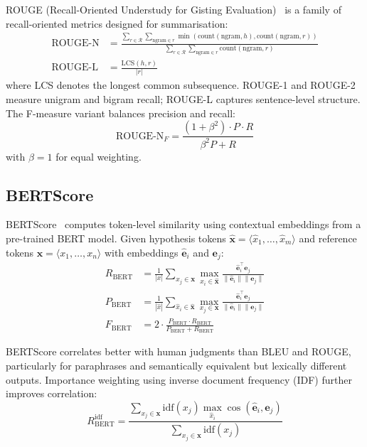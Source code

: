 ROUGE (Recall-Oriented Understudy for Gisting Evaluation)~\cite{lin2004rouge} is a family of recall-oriented metrics designed for summarisation: 
\begin{align}
    \text{ROUGE-N} &= \frac{\sum_{r \in \mathcal{R}} \sum_{\text{ngram} \in r} \min(\text{count}(\text{ngram}, h), \text{count}(\text{ngram}, r))}{\sum_{r \in \mathcal{R}} \sum_{\text{ngram} \in r} \text{count}(\text{ngram}, r)} \\[6pt]
    \text{ROUGE-L} &= \frac{\text{LCS}(h, r)}{|r|}
\end{align}
 where LCS denotes the longest common subsequence. ROUGE-1 and ROUGE-2 measure unigram and bigram recall; ROUGE-L captures sentence-level structure. The F-measure variant balances precision and recall: 
\begin{equation}
    \text{ROUGE-N}_F = \frac{(1+\beta^2) \cdot P \cdot R}{\beta^2 P + R}
\end{equation}
 with $\beta = 1$ for equal weighting.

\subsection{BERTScore}
\label{bertscore}

BERTScore~\cite{zhang2020bertscore} computes token-level similarity using contextual embeddings from a pre-trained BERT model. Given hypothesis tokens $\hat{\mathbf{x}} = \langle \hat{x}_1, \ldots, \hat{x}_m \rangle$ and reference tokens $\mathbf{x} = \langle x_1, \ldots, x_n \rangle$ with embeddings $\hat{\mathbf{e}}_i$ and $\mathbf{e}_j$: 
\begin{align}
    R_{\text{BERT}} &= \frac{1}{|x|} \sum_{x_j \in \mathbf{x}} \max_{\hat{x}_i \in \hat{\mathbf{x}}} \frac{\hat{\mathbf{e}}_i^\top \mathbf{e}_j}{\|\hat{\mathbf{e}}_i\| \|\mathbf{e}_j\|} \\[4pt]
    P_{\text{BERT}} &= \frac{1}{|\hat{x}|} \sum_{\hat{x}_i \in \hat{\mathbf{x}}} \max_{x_j \in \mathbf{x}} \frac{\hat{\mathbf{e}}_i^\top \mathbf{e}_j}{\|\hat{\mathbf{e}}_i\| \|\mathbf{e}_j\|} \\[4pt]
    F_{\text{BERT}} &= 2 \cdot \frac{P_{\text{BERT}} \cdot R_{\text{BERT}}}{P_{\text{BERT}} + R_{\text{BERT}}}
\end{align}

BERTScore correlates better with human judgments than BLEU and ROUGE, particularly for paraphrases and semantically equivalent but lexically different outputs. Importance weighting using inverse document frequency (IDF) further improves correlation: 
\begin{equation}
    R_{\text{BERT}}^{\text{idf}} = \frac{\sum_{x_j \in \mathbf{x}} \text{idf}(x_j) \max_{\hat{x}_i} \cos(\hat{\mathbf{e}}_i, \mathbf{e}_j)}{\sum_{x_j \in \mathbf{x}} \text{idf}(x_j)}
\end{equation}

